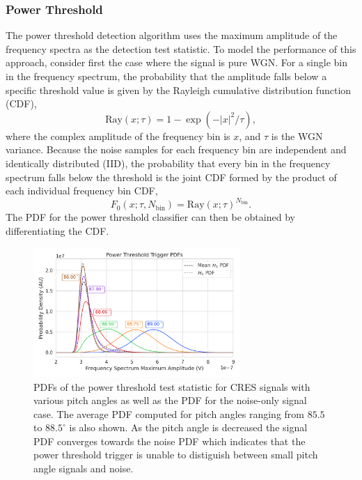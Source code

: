 \subsubsection{Power Threshold}

The power threshold detection algorithm uses the maximum amplitude of the frequency spectra  as the detection test statistic. To model the performance of this approach, consider first the case where the signal is pure WGN. For a single bin in the frequency spectrum, the probability that the amplitude falls below a specific threshold value is given by the Rayleigh cumulative distribution function (CDF),
\begin{equation}
    \mathrm{Ray}(x;\tau)=1-\exp{\left(-|x|^2/\tau\right)},
\end{equation}
where the complex amplitude of the frequency bin is $x$, and $\tau$ is the WGN variance. Because the noise samples for each frequency bin are independent and identically distributed (IID), the probability that every bin in the frequency spectrum falls below the threshold is the joint CDF formed by the product of each individual frequency bin CDF,
\begin{equation}
    F_0(x;\tau, N_\mathrm{bin})=\mathrm{Ray}(x;\tau)^{N_\textrm{bin}}.
    \label{eq:fft_spectrum_cdf0}
\end{equation}
The PDF for the power threshold classifier can then be obtained by differentiating the CDF.

\begin{figure}[htbp]
    \centering
    \includegraphics[width=0.7\textwidth]{figs/Chapter-4/230313_fft_power_threshold_pdf_by_pitch.png}
    \caption{PDFs of the power threshold test statistic for CRES signals with various pitch angles as well as the PDF for the noise-only signal case. The average PDF computed for pitch angles ranging from $85.5$ to $88.5^\circ$ is also shown. As the pitch angle is decreased the signal PDF converges towards the noise PDF which indicates that the power threshold trigger is unable to distiguish between small pitch angle signals and noise. }
    \label{fig:fft_pdf}
\end{figure}

